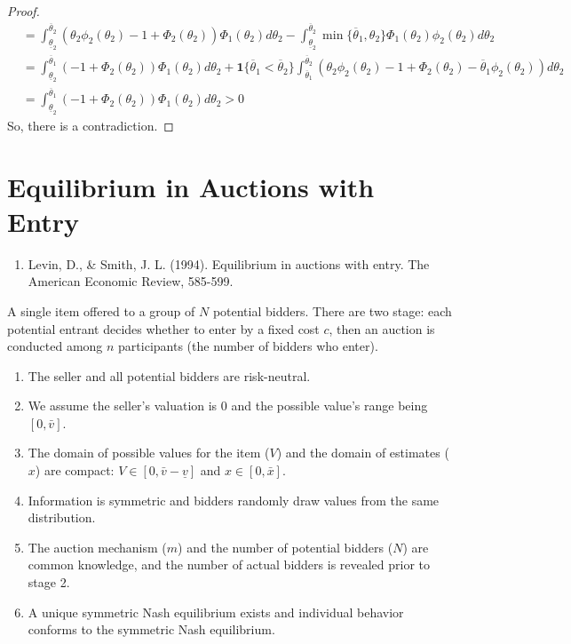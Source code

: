 \documentclass[11pt]{elegantbook_2}
\begin{document}
\begin{proof}
\begin{equation}
\begin{aligned}
            &=\int_{\underline{\theta}_2}^{\overline{\theta}_2}\left(\theta_2\phi_2(\theta_2)-1+\Phi_2(\theta_2)\right)\Phi_1(\theta_2)d\theta_2
            -\int_{\underline{\theta}_2}^{\overline{\theta}_2}\min\{\overline{\theta}_1,\theta_2\}\Phi_1(\theta_2)\phi_2(\theta_2)d\theta_2\\
            &=\int_{\underline{\theta}_2}^{\overline{\theta}_1}\left(-1+\Phi_2(\theta_2)\right)\Phi_1(\theta_2)d\theta_2+\mathbf{1}\{\overline{\theta}_1<\overline{\theta}_2\}\int_{\overline{\theta}_1}^{\overline{\theta}_2}\left(\theta_2\phi_2(\theta_2)-1+\Phi_2(\theta_2)-\overline{\theta}_1\phi_2(\theta_2)\right)d\theta_2\\
            &=\int_{\underline{\theta}_2}^{\overline{\theta}_1}\left(-1+\Phi_2(\theta_2)\right)\Phi_1(\theta_2)d\theta_2>0
        \end{aligned}
        \nonumber
    \end{equation}
    So, there is a contradiction.
\end{proof}



\section{Equilibrium in Auctions with Entry}
\begin{enumerate}[$\circ$]
    \item Levin, D., \& Smith, J. L. (1994). Equilibrium in auctions with entry. The American Economic Review, 585-599.
\end{enumerate}
A single item offered to a group of $N$ potential bidders. There are two stage: each potential  entrant decides whether to enter by a fixed cost $c$, then an auction is conducted among $n$ participants (the number of bidders who enter).
\begin{assumption}
    \begin{enumerate}
        \item The seller and all potential bidders are risk-neutral.
        \item We assume the seller's valuation is $0$ and the possible value's range being $[0,\bar{v}]$.
        \item The domain of possible values for the item ($V$) and the domain of estimates ($x$) are compact: $V\in[0,\bar{v}-\underline{v}]$ and $x\in [0,\bar{x}]$.
        \item Information is symmetric and bidders randomly draw values from the same distribution.
        \item The auction mechanism ($m$) and the number of potential bidders ($N$) are common knowledge, and the number of actual bidders is revealed prior to stage 2.
        \item A unique symmetric Nash equilibrium exists and individual behavior conforms to the symmetric Nash equilibrium.
    \end{enumerate}
\end{assumption}
\end{document}
